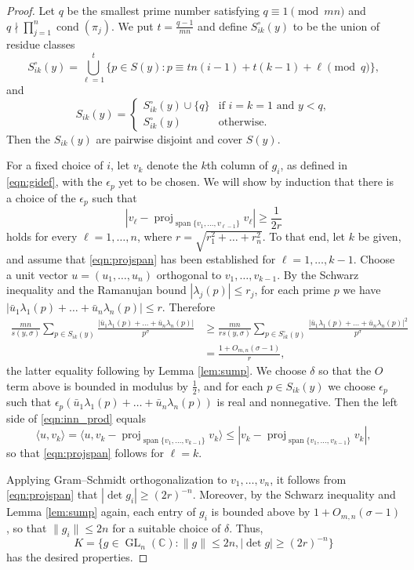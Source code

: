 \documentclass[11pt]{amsart}
\theoremstyle{remark}
\numberwithin{theorem}{section}
\numberwithin{equation}{section}
\newcommand{\C}{\mathbb{C}}
\DeclareMathOperator{\proj}{proj}
\DeclareMathOperator{\textspan}{span}
\DeclareMathOperator{\GL}{GL}
\DeclareMathOperator{\cond}{cond}
\begin{document}
\begin{proof}
Let $q$ be the smallest prime number satisfying $q\equiv1\pmod{mn}$ and
$q\nmid\prod_{j=1}^n\cond(\pi_j)$. We put $t=\frac{q-1}{mn}$ and
define $S_{ik}^\circ(y)$ to be the union of residue classes
$$
S_{ik}^\circ(y)=\bigcup_{\ell=1}^t
\bigl\{p\in S(y):p\equiv tn(i-1)+t(k-1)+\ell\pmod{q}\bigr\},
$$
and
$$
S_{ik}(y)=\begin{cases}
S_{ik}^\circ(y)\cup\{q\}&\text{if }
i=k=1\text{ and }y<q,\\
S_{ik}^\circ(y)&\text{otherwise}.
\end{cases}
$$
Then the $S_{ik}(y)$ are pairwise disjoint and cover $S(y)$.

For a fixed choice of $i$, let $v_k$ denote the $k$th column of $g_i$,
as defined in \eqref{eqn:gidef}, with the $\epsilon_p$ yet to be chosen.
We will show by induction that there is a choice of the $\epsilon_p$ such that
\begin{equation}\label{eqn:projspan}
|v_\ell - \proj_{\textspan\{v_1, \ldots, v_{\ell - 1}\}} v_\ell| \geq
\frac{1}{2r}
\end{equation}
holds for every $\ell=1,\ldots,n$, where $r=\sqrt{r_1^2+\ldots+r_n^2}$.
To that end,
let $k$ be given, and assume that \eqref{eqn:projspan} has been
established for $\ell=1,\ldots,k-1$.  Choose a unit vector
$u = (u_1, \ldots, u_n)$ orthogonal to $v_1, \ldots, v_{k - 1}$.
By the Schwarz inequality and the Ramanujan bound
$|\lambda_j(p)|\le r_j$, for each prime $p$ we have
$
|\bar{u}_1 \lambda_1(p) + \ldots + \bar{u}_n \lambda_n(p)| \leq
r.
$
Therefore
\begin{align}\label{eqn:inn_prod}
\frac{mn}{s(y, \sigma)}
\sum_{p\in S_{ik}(y)}
\frac{|\bar{u}_1\lambda_1(p)+\ldots+\bar{u}_n\lambda_n(p)|}{p^\sigma}
&\geq\frac{mn}{r s(y, \sigma)} \sum_{p\in S_{ik}^\circ(y)}
\frac{|\bar{u}_1\lambda_1(p)+\ldots+\bar{u}_n\lambda_n(p)|^2}{p^\sigma}\\
&=\frac{1+O_{m, n}(\sigma-1)}{r}, \nonumber
\end{align}
the latter equality following by Lemma \ref{lem:sump}.
We choose $\delta$ so that the $O$ term
above is bounded in modulus by $\frac12$, and
for each $p \in S_{ik}(y)$ we choose $\epsilon_p$ such that
$\epsilon_p (\bar{u}_1 \lambda_1(p) + \ldots + \bar{u}_n \lambda_n(p))$
is real and nonnegative. Then 
the left side of \eqref{eqn:inn_prod} equals
\[
\langle u, v_k \rangle = 
\langle u, v_k - \proj_{\textspan\{v_1, \ldots, v_{k - 1}\}} v_k \rangle \leq
|v_k - \proj_{\textspan\{v_1, \ldots, v_{k - 1}\}} v_k|,
\]
so that \eqref{eqn:projspan} follows for $\ell=k$.

Applying Gram--Schmidt orthogonalization to $v_1,\ldots,v_n$, it follows
from \eqref{eqn:projspan} that
$|\det{g_i}|\ge (2r)^{-n}$. Moreover, by the Schwarz inequality
and Lemma \ref{lem:sump} again, each entry of $g_i$ is bounded above by
$1+O_{m, n}(\sigma-1)$,
so that $\|g_i\|\le2n$ for a suitable choice of $\delta$. Thus,
\begin{equation}\label{eqn:def_K}
K=\{g\in\GL_n(\C):\|g\|\le 2n, |\det{g}|\ge(2r)^{-n}\}
\end{equation}
has the desired properties.
\end{proof}
\end{document}
